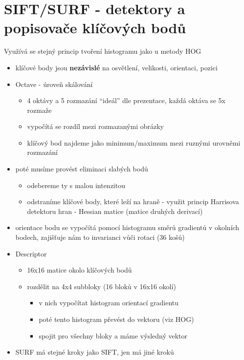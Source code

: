 \section{SIFT/SURF - detektory a popisovače klíčových bodů}
Využívá se stejný princip tvoření histogramu jako u metody HOG
\begin{itemize}
    \item klíčové body jsou \textbf{nezávislé} na osvětlení, velikosti, orientaci, pozici
    \item Octave - úroveň skálování
          \begin{itemize}
              \item 4 oktávy a 5 rozmazání “ideál” dle prezentace, každá oktáva se 5x rozmaže
              \item vypočítá se rozdíl mezi rozmazanými obrázky
              \item klíčový bod najdeme jako minimum/maximum mezi ruznými urovněmi rozmazání
          \end{itemize}
    \item poté musíme provést eliminaci slabých bodů
          \begin{itemize}
              \item odebereme ty s malou intenzitou
              \item odstraníme klíčové body, které leží na hraně - využit princip Harrisova detektoru hran - Hessian matice (matice druhých derivací)
          \end{itemize}
    \item orientace bodu se vypočítá pomocí histogramu směrů gradientů v okolních bodech, zajišťuje nám to invarianci vůči rotaci (36 košů)
    \item Descriptor
          \begin{itemize}
              \item 16x16 matice okolo klíčových bodů
              \item rozdělit na 4x4 subbloky (16 bloků v 16x16 okolí)
                    \begin{itemize}
                        \item v nich vypočítat histogram orientací gradientu
                        \item poté tento histogram převést do vektoru (viz HOG)
                        \item spojit pro všechny bloky a máme výsledný vektor
                    \end{itemize}
          \end{itemize}
    \item SURF má stejné kroky jako SIFT, jen má jiné  kroků
\end{itemize}

